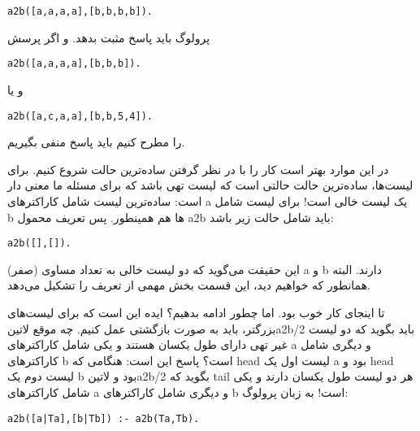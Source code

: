 \begin{latin}
\begin{lstlisting}
a2b([a,a,a,a],[b,b,b,b]).
\end{lstlisting}
\end{latin}

پرولوگ باید پاسخ مثبت بدهد. و اگر پرسش

\begin{latin}
\begin{lstlisting}
a2b([a,a,a,a],[b,b,b]).
\end{lstlisting}
\end{latin}

و یا

\begin{latin}
\begin{lstlisting}
a2b([a,c,a,a],[b,b,5,4]).
\end{lstlisting}
\end{latin}

را مطرح کنیم باید پاسخ منفی بگیریم.

در این موارد بهتر است کار را با در نظر گرفتن ساده‌ترین حالت شروع کنیم. برای لیست‌ها، ساده‌ترین حالت حالتی است که لیست تهی باشد که برای مسئله ما معنی دار است: ساده‌ترین لیست شامل کاراکترهای a یک لیست خالی است! برای لیست شامل b ها هم همینطور. پس تعریف محمول a2b باید شامل حالت زیر باشد:

\begin{latin}
\begin{lstlisting}
a2b([],[]).
\end{lstlisting}
\end{latin}

این حقیقت می‌گوید که دو لیست خالی به تعداد مساوی (صفر) a و b دارند. البته همانطور که خواهیم دید، این قسمت بخش مهمی از تعریف را تشکیل می‌دهد.

تا اینجای کار خوب بود. اما چطور ادامه بدهیم؟ ایده این است که برای لیست‌های بزرگتر، باید به صورت بازگشتی عمل کنیم. چه موقع ‌لاتین{a2b/2} باید بگوید که دو لیست غیر تهی دارای طول یکسان هستند و یکی شامل کاراکترهای a و دیگری شامل کاراکترهای b است؟ پاسخ این است: هنگامی که head لیست اول یک a بود و head لیست دوم یک b بود و ‌لاتین{a2b/2} بگوید که tail هر دو لیست طول یکسان دارند و یکی شامل کاراکترهای a و دیگری شامل کاراکترهای b است! به زبان پرولوگ:

\begin{latin}
\begin{lstlisting}
a2b([a|Ta],[b|Tb]) :- a2b(Ta,Tb).
\end{lstlisting}
\end{latin}

